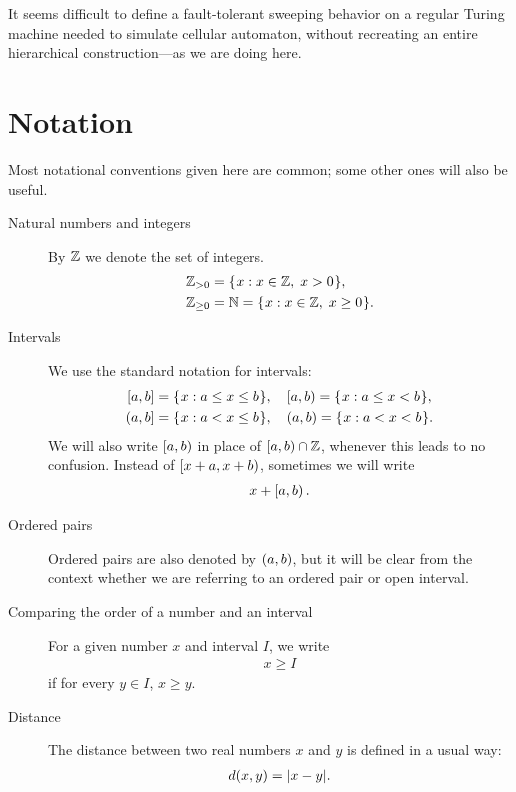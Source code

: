 \documentclass[12pt]{memoir}
\renewcommand{\le}{\leq}
\renewcommand{\ge}{\geq}
\begin{document}
It seems difficult to define a fault-tolerant sweeping 
behavior on a regular Turing machine needed to 
simulate cellular automaton, without recreating
an entire hierarchical construction---as we are doing here.


\section{Notation}\label{sec:notation}

Most notational conventions given here are common; some other ones will
also be useful.

\begin{description}

\item [Natural numbers and integers] 
By \( \mathbb{Z} \) we denote the set of integers.
\begin{align*}
   \bbZ_{>0}&=\setOf{x}{x\in \bbZ,\;  x>0}, \\
   \bbZ_{\ge 0}&=\bbN=\setOf{x}{x\in \bbZ,\;  x\ge 0}.
\end{align*}

\item [Intervals]
We use the standard notation for intervals:
\begin{align*}
   \clint{a}{b}&=\setOf{x}{a\le x \le b},\quad \lint{a}{b}=\setOf{x}{a\le x < b}, \\
   \rint{a}{b}&=\setOf{x}{a< x \le b}, \quad  \opint{a}{b}=\setOf{x}{a< x < b}.
\end{align*}
We will also write \( \left[a,b\right) \) in place of \( \left[a,b\right)\cap \mathbb{Z} \), 
whenever this leads to no confusion.
Instead of \( \left[x+a,x+b\right) \), sometimes we will write 
\begin{align*}x + \left[a,b\right).\end{align*}

\item [Ordered pairs]
Ordered pairs are also denoted by \( (a,b) \),
but it will be clear from the context whether we are
referring to an ordered pair or open interval.

\item [Comparing the order of a number and an interval]
For a given number \( x \) and interval \( I \), we
write
\begin{align*} x \ge I \end{align*}
if for every \( y\in I \),  \( x \ge y \).

\item [Distance]
The distance between two real numbers \( x \) and \( y \) is defined
in a usual way:
\begin{align*}
    d(x,y)= \lvert x-y \rvert.
\end{align*}


\end{description}
\end{document}
